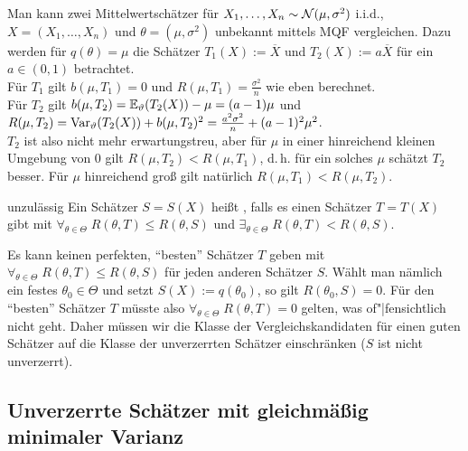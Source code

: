 \begin{Bsp}
    Man kann zwei Mittelwertschätzer für $X_1, \dotsc, X_n \sim \mathcal{N}(\mu, \sigma^2)$ i.i.d.,
    $X = (X_1, \dotsc, X_n)$ und $\theta = (\mu, \sigma^2)$ unbekannt mittels MQF vergleichen.
    Dazu werden für $q(\theta) = \mu$
    die Schätzer $T_1(X) := \overline{X}$ und $T_2(X) := a \overline{X}$ für ein
    $a \in (0, 1)$ betrachtet.\\
    Für $T_1$ gilt $b(\mu, T_1) = 0$ und $R(\mu, T_1) = \frac{\sigma^2}{n}$ wie eben berechnet.\\
    Für $T_2$ gilt $b(\mu, T_2) = \mathbb{E}_\vartheta(T_2(X)) - \mu = (a - 1)\mu$ und\\
    $R(\mu, T_2) = \mathrm{Var}_\vartheta(T_2(X)) + b(\mu, T_2)^2 = \frac{a^2 \sigma^2}{n} + (a-1)^2 \mu^2$.\\
    $T_2$ ist also nicht mehr erwartungstreu, aber für $\mu$ in einer hinreichend kleinen Umgebung
    von $0$ gilt $R(\mu, T_2) < R(\mu, T_1)$, d.\,h. für ein solches $\mu$ schätzt $T_2$ besser.
    Für $\mu$ hinreichend groß gilt natürlich $R(\mu, T_1) < R(\mu, T_2)$.
\end{Bsp}

\linie

\begin{Def}{unzulässig}
    Ein Schätzer $S = S(X)$ heißt , falls es einen Schätzer $T = T(X)$ gibt
    mit $\forall_{\theta \in \Theta}\; R(\theta, T) \le R(\theta, S)$ und
    $\exists_{\theta \in \Theta}\; R(\theta, T) < R(\theta, S)$.
\end{Def}

\begin{Bem}
    Es kann keinen perfekten, "`besten"' Schätzer $T$ geben mit
    $\forall_{\theta \in \Theta}\; R(\theta, T) \le R(\theta, S)$ für jeden anderen Schätzer $S$.
    Wählt man nämlich ein festes $\theta_0 \in \Theta$ und setzt $S(X) := q(\theta_0)$, so gilt
    $R(\theta_0, S) = 0$.
    Für den "`besten"' Schätzer $T$ müsste also $\forall_{\theta \in \Theta}\; R(\theta, T) = 0$
    gelten, was of"|fensichtlich nicht geht.
    Daher müssen wir die Klasse der Vergleichskandidaten für einen guten Schätzer auf die Klasse
    der unverzerrten Schätzer einschränken ($S$ ist nicht unverzerrt).
\end{Bem}

\pagebreak

\subsection{%
    Unverzerrte Schätzer mit gleichmäßig minimaler Varianz%
}

